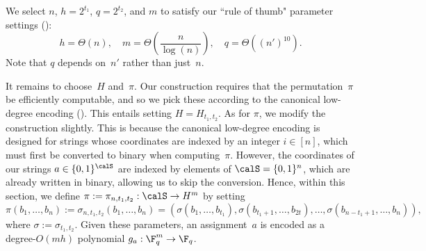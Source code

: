 We select $n$, $h = 2^{t_1}$, $q = 2^{t_2}$, and $m$ to satisfy our ``rule of thumb" parameter settings ():
\begin{equation*}
	h = \Theta(n), \quad m = \Theta\left(\frac{n}{\log(n)}\right), \quad q = \Theta((n')^{10}).
\end{equation*}
Note that $q$ depends on~$n'$ rather than just~$n$.

It remains to choose~$H$ and~$\pi$.
Our construction requires that the permutation~$\pi$ be efficiently computable,
and so we pick these according to the canonical low-degree encoding ().
This entails setting $H= H_{t_1, t_2}$.
As for $\pi$, we modify the construction slightly.
This is because the canonical low-degree encoding is designed for strings whose coordinates are indexed by an integer $i \in[n]$,
which must first be converted to binary when computing~$\pi$.
However, the coordinates of our strings $a \in \{0, 1\}^{\calS}$ are indexed by elements of $\calS = \{0, 1\}^n$,
which are already written in binary, allowing us to skip the conversion.
Hence, within this section, we define $\pi:=\pi_{n, t_1, t_2} :\calS \rightarrow H^m$ by setting
\begin{equation*}
\pi(b_1, \ldots, b_n) := \sigma_{n, t_1, t_2}(b_1, \ldots, b_n)= (\sigma(b_1, \ldots, b_{t_1}), \sigma(b_{t_1+1}, \ldots, b_{2t}), \ldots, \sigma(b_{n-t_1+1}, \ldots, b_n)),
\end{equation*}
where $\sigma:=\sigma_{t_1, t_2}$.
Given these parameters,
an assignment~$a$ is encoded as a degree-$O(mh)$ polynomial $g_a:\F_q^m \rightarrow \F_q$.

